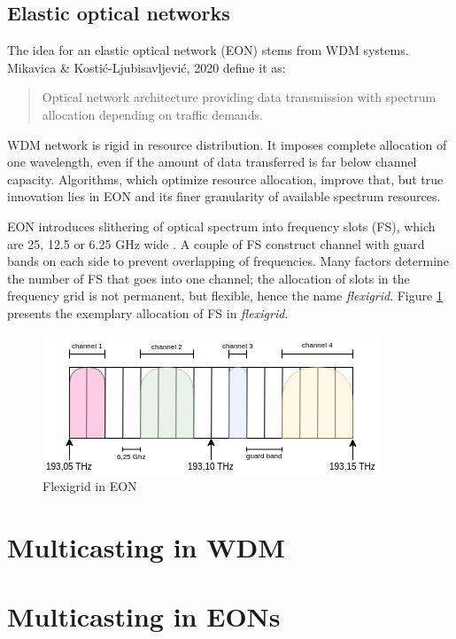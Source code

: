 \documentclass[conference]{IEEEtran}
\begin{document}
\subsection{Elastic optical networks}
The idea for an elastic optical network (EON) stems from WDM systems. Mikavica \& Kostić-Ljubisavljević, 2020 \cite{eon_definition} define it as:

\begin{quote}
Optical network architecture providing data transmission with spectrum allocation depending on traffic demands.
\end{quote}

WDM network is rigid in resource distribution. It imposes complete allocation of one wavelength, even if the amount of data transferred is far below channel capacity. Algorithms, which optimize resource allocation, improve that, but true innovation lies in EON and its finer granularity of available spectrum resources.

EON introduces slithering of optical spectrum into frequency slots (FS), which are 25, 12.5 or 6.25 GHz wide \cite{eon_fs}. A couple of FS construct channel with guard bands on each side to prevent overlapping of frequencies. Many factors determine the number of FS that goes into one channel; the allocation of slots in the frequency grid is not permanent, but flexible, hence the name \textit{flexigrid}. Figure \ref{eon_flexigrid} presents the exemplary allocation of FS in \textit{flexigrid}.

\begin{figure}[htbp]
	\centerline{\includegraphics[scale=0.65]{flexigrid.png}}
	\caption{Flexigrid in EON}
	\label{eon_flexigrid}
\end{figure}

\section{Multicasting in WDM}

\section{Multicasting in EONs}
\end{document}
